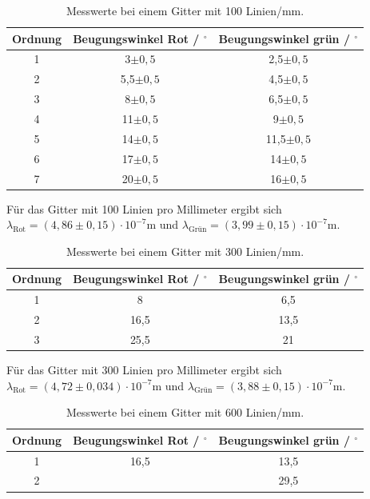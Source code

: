 \begin{table}[H]
  \centering
  \caption{Messwerte bei einem Gitter mit 100 Linien/mm.}
  \label{tab:git100}
  \begin{tabular}{c c c}
    \toprule
    Ordnung & Beugungswinkel Rot / $^{\circ}$ & Beugungswinkel grün / $^{\circ}$\\
    \midrule
    1 & 3$\pm 0,5$ & 2,5$\pm 0,5$\\
    2 & 5,5$\pm 0,5$ & 4,5$\pm 0,5$\\
    3 & 8$\pm 0,5$ & 6,5$\pm 0,5$\\
    4 & 11$\pm 0,5$ & 9$\pm 0,5$\\
    5 & 14$\pm 0,5$ & 11,5$\pm 0,5$\\
    6 & 17$\pm 0,5$ & 14$\pm 0,5$\\
    7 & 20$\pm 0,5$ & 16$\pm 0,5$\\
    \bottomrule
  \end{tabular}
\end{table}

\noindent
Für das Gitter mit 100 Linien pro Millimeter ergibt sich $\lambda_\text{Rot} = (4,86 \pm 0,15) \cdot 10^{-7} \si{\meter}$ und
$\lambda_\text{Grün} = (3,99 \pm 0,15) \cdot 10^{-7} \si{\meter}$.

\begin{table}[H]
  \centering
  \caption{Messwerte bei einem Gitter mit 300 Linien/mm.}
  \label{tab:git300}
  \begin{tabular}{c c c}
    \toprule
    Ordnung & Beugungswinkel Rot / $^{\circ}$ & Beugungswinkel grün / $^{\circ}$\\
    \midrule
    1 & 8 & 6,5\\
    2 & 16,5 & 13,5\\
    3 & 25,5 & 21\\
    \bottomrule
  \end{tabular}
\end{table}

\noindent
Für das Gitter mit 300 Linien pro Millimeter ergibt sich $\lambda_\text{Rot} = (4,72 \pm 0,034) \cdot 10^{-7} \si{\meter}$ und
$\lambda_\text{Grün} = (3,88 \pm 0,15) \cdot 10^{-7} \si{\meter}$.

\begin{table}[H]
  \centering
  \caption{Messwerte bei einem Gitter mit 600 Linien/mm.}
  \label{tab:git600}
  \begin{tabular}{c c c}
    \toprule
    Ordnung & Beugungswinkel Rot / $^{\circ}$ & Beugungswinkel grün / $^{\circ}$\\
    \midrule
    1 & 16,5 & 13,5\\
    2 & & 29,5\\
    \bottomrule
  \end{tabular}
\end{table}

